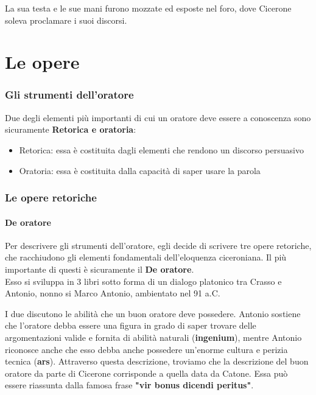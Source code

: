 \documentclass[10pt,a4paper]{article}
\begin{document}
La sua testa e le sue mani furono mozzate ed esposte nel foro, dove Cicerone soleva proclamare i suoi discorsi. 

\part*{Le opere}

\section*{Gli strumenti dell'oratore}

Due degli elementi più importanti di cui un oratore deve essere a conoscenza sono sicuramente \textbf{Retorica e oratoria}:

\begin{itemize}
	\item Retorica: essa è costituita dagli elementi che rendono un discorso persuasivo
	\item Oratoria: essa è costituita dalla capacità di saper usare la parola
\end{itemize} 

\section*{Le opere retoriche}

\subsection*{De oratore}

Per descrivere gli strumenti dell'oratore, egli decide di scrivere tre opere retoriche, che racchiudono gli elementi fondamentali dell'eloquenza ciceroniana. Il più importante di questi è sicuramente il \textbf{De oratore}.\\

Esso si sviluppa in 3 libri sotto forma di un dialogo platonico tra Crasso e Antonio, nonno si Marco Antonio, ambientato nel 91 a.C.

I due discutono le abilità che un buon oratore deve possedere. Antonio sostiene che l'oratore debba essere una figura in grado di saper trovare delle argomentazioni valide e fornita di abilità naturali (\textbf{ingenium}), mentre Antonio riconosce anche che esso debba anche possedere un'enorme cultura e perizia tecnica (\textbf{ars}). Attraverso questa descrizione, troviamo che la descrizione del buon oratore da parte di Cicerone corrisponde a quella data da Catone. Essa può essere riassunta dalla famosa frase \textbf{"vir bonus dicendi peritus"}.\\
\end{document}

